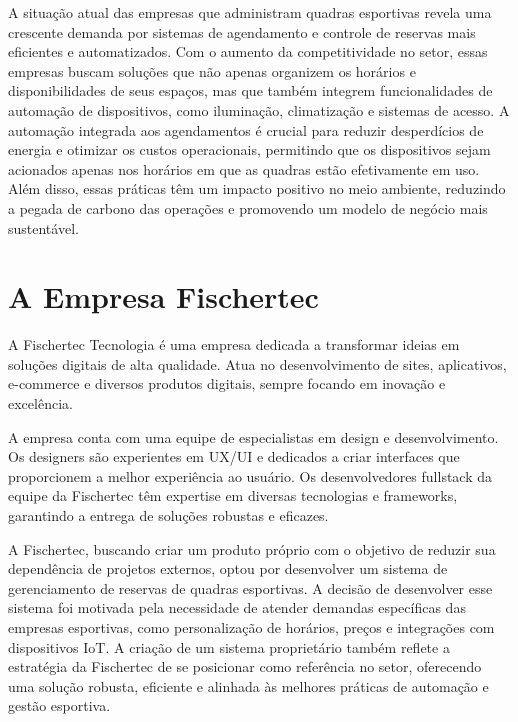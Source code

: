 

A situação atual das empresas que administram quadras esportivas revela uma crescente demanda por sistemas de agendamento e controle de reservas mais eficientes e automatizados. Com o aumento da competitividade no setor, essas empresas buscam soluções que não apenas organizem os horários e disponibilidades de seus espaços, mas que também integrem funcionalidades de automação de dispositivos, como iluminação, climatização e sistemas de acesso. A automação integrada aos agendamentos é crucial para reduzir desperdícios de energia e otimizar os custos operacionais, permitindo que os dispositivos sejam acionados apenas nos horários em que as quadras estão efetivamente em uso. Além disso, essas práticas têm um impacto positivo no meio ambiente, reduzindo a pegada de carbono das operações e promovendo um modelo de negócio mais sustentável.

\section{A Empresa Fischertec}

A Fischertec Tecnologia \cite{fischertec} é uma empresa dedicada a transformar ideias em soluções digitais de alta qualidade. Atua no desenvolvimento de sites, aplicativos, e-commerce e diversos produtos digitais, sempre focando em inovação e excelência.

A empresa conta com uma equipe de especialistas em design e desenvolvimento. Os designers são experientes em UX/UI e dedicados a criar interfaces que proporcionem a melhor experiência ao usuário. Os desenvolvedores fullstack da equipe da Fischertec têm expertise em diversas tecnologias e frameworks, garantindo a entrega de soluções robustas e eficazes.

A Fischertec, buscando criar um produto próprio com o objetivo de reduzir sua dependência de projetos externos, optou por desenvolver um sistema de gerenciamento de reservas de quadras esportivas. A decisão de desenvolver esse sistema foi motivada pela necessidade de atender demandas específicas das empresas esportivas, como personalização de horários, preços e integrações com dispositivos IoT. A criação de um sistema proprietário também reflete a estratégia da Fischertec de se posicionar como referência no setor, oferecendo uma solução robusta, eficiente e alinhada às melhores práticas de automação e gestão esportiva.

